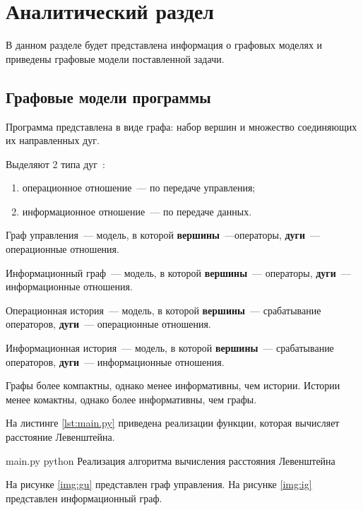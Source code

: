 \chapter{Аналитический раздел}

В данном разделе будет представлена информация о графовых моделях и приведены графовые модели поставленной задачи.


\section{Графовые модели программы}

Программа представлена в виде графа: набор вершин и множество соединяющих их направленных дуг.


Выделяют 2 типа дуг~\cite{graph}:
\begin{enumerate}
	\item операционное отношение~--- по передаче управления;
	\item информационное отношение~--- по передаче данных.
\end{enumerate}

Граф управления~--- модель, в которой \textbf{вершины}~---операторы, \textbf{дуги}~--- операционные отношения.

Информационный граф~--- модель, в которой \textbf{вершины}~--- операторы, \textbf{дуги}~--- информационные отношения.

Операционная история~--- модель, в которой \textbf{вершины}~--- срабатывание операторов, \textbf{дуги}~--- операционные отношения.

Информационная история~--- модель, в которой \textbf{вершины}~--- срабатывание операторов, \textbf{дуги}~--- информационные отношения.

Графы более компактны, однако менее информативны, чем истории. Истории менее комактны, однако более информативны, чем графы.

На листинге \ref{lst:main.py} приведена реализации функции, которая вычисляет расстояние Левенштейна.

\clearpage

{main.py} %
{python} %
{Реализация алгоритма вычисления расстояния Левенштейна} %

\clearpage


На рисунке \ref{img:gu} представлен граф управления.
На рисунке \ref{img:ig} представлен информационный граф.

